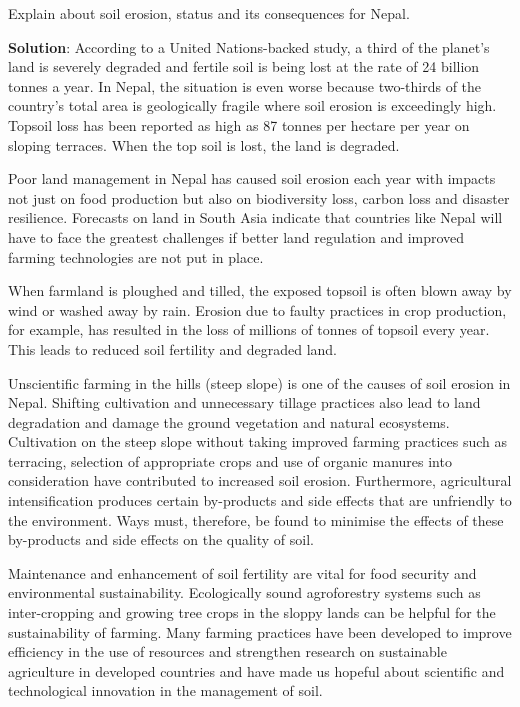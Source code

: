 \documentclass[
  openany]{book}
\newcommand{\question}{\item}
\newenvironment{solution}{ {\bfseries Solution}:}{}
\begin{document}
\begin{questions}
\question Explain about soil erosion, status and its consequences for Nepal. 

\begin{solution}
According to a United Nations-backed study, a third of the planet's land is severely degraded and fertile soil is being lost at the rate of 24 billion tonnes a year. In Nepal, the situation is even worse because two-thirds of the country's total area is geologically fragile where soil erosion is exceedingly high. Topsoil loss has been reported as high as 87 tonnes per hectare per year on sloping terraces. When the top soil is lost, the land is degraded.

Poor land management in Nepal has caused soil erosion each year with impacts not just on food production but also on biodiversity loss, carbon loss and disaster resilience. Forecasts on land in South Asia indicate that countries like Nepal will have to face the greatest challenges if better land regulation and improved farming technologies are not put in place.

When farmland is ploughed and tilled, the exposed topsoil is often blown away by wind or washed away by rain. Erosion due to faulty practices in crop production, for example, has resulted in the loss of millions of tonnes of topsoil every year. This leads to reduced soil fertility and degraded land.

Unscientific farming in the hills (steep slope) is one of the causes of soil erosion in Nepal. Shifting cultivation and unnecessary tillage practices also lead to land degradation and damage the ground vegetation and natural ecosystems. Cultivation on the steep slope without taking improved farming practices such as terracing, selection of appropriate crops and use of organic manures into consideration have contributed to increased soil erosion. Furthermore, agricultural intensification produces certain by-products and side effects that are unfriendly to the environment. Ways must, therefore, be found to minimise the effects of these by-products and side effects on the quality of soil.

Maintenance and enhancement of soil fertility are vital for food security and environmental sustainability. Ecologically sound agroforestry systems such as inter-cropping and growing tree crops in the sloppy lands can be helpful for the sustainability of farming. Many farming practices have been developed to improve efficiency in the use of resources and strengthen research on sustainable agriculture in developed countries and have made us hopeful about scientific and technological innovation in the management of soil.


\end{solution}
\end{questions}
\end{document}

